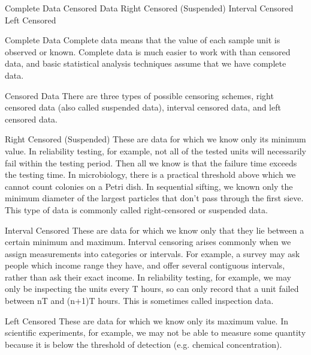 

Complete Data
Censored Data
Right Censored (Suspended)
Interval Censored
Left Censored


Complete Data
Complete data means that the value of each sample unit is observed or known. Complete data is much easier to work with than censored data, and basic statistical analysis techniques assume that we have complete data.
 
Censored Data
There are three types of possible censoring schemes, right censored data (also called suspended data), interval censored data, and left censored data.
 
Right Censored (Suspended)
These are data for which we know only its minimum value. In reliability testing, for example, not all of the tested units will necessarily fail within the testing period. Then all we know is that the failure time exceeds the testing time. In microbiology, there is a practical threshold above which we cannot count colonies on a Petri dish. In sequential sifting, we known only the minimum diameter of the largest particles that don't pass through the first sieve. This type of data is commonly called right-censored or suspended data.
 
Interval Censored
These are data for which we know only that they lie between a certain minimum and maximum. Interval censoring arises commonly when we assign measurements into categories or intervals. For example, a survey may ask people which income range they have, and offer several contiguous intervals, rather than ask their exact income. In reliability testing, for example, we may only be inspecting the units every T hours, so can only record that a unit failed between nT and (n+1)T hours. This is sometimes called inspection data.
 
Left Censored
These are data for which we know only its maximum value. In scientific experiments, for example, we may not be able to measure some quantity because it is below the threshold of detection (e.g. chemical concentration).
 


